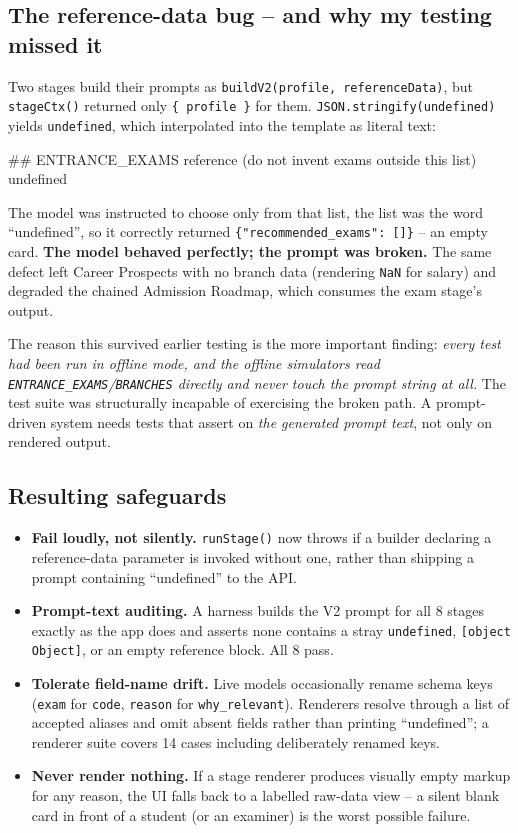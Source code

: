 \documentclass[11pt]{article}
\begin{document}
\subsection{The reference-data bug -- and why my testing missed it}
\label{sec:refdata}
Two stages build their prompts as \texttt{buildV2(profile, referenceData)}, but \texttt{stageCtx()} returned only \texttt{\{ profile \}} for them. \texttt{JSON.stringify(undefined)} yields \texttt{undefined}, which interpolated into the template as literal text:

\begin{code}
## ENTRANCE_EXAMS reference (do not invent exams outside this list)
undefined
\end{code}

The model was instructed to choose only from that list, the list was the word ``undefined'', so it correctly returned \texttt{\{"recommended\_exams": []\}} -- an empty card. \textbf{The model behaved perfectly; the prompt was broken.} The same defect left Career Prospects with no branch data (rendering \texttt{NaN} for salary) and degraded the chained Admission Roadmap, which consumes the exam stage's output.

The reason this survived earlier testing is the more important finding: \emph{every test had been run in offline mode, and the offline simulators read \texttt{ENTRANCE\_EXAMS}/\texttt{BRANCHES} directly and never touch the prompt string at all.} The test suite was structurally incapable of exercising the broken path. A prompt-driven system needs tests that assert on \emph{the generated prompt text}, not only on rendered output.

\subsection{Resulting safeguards}
\begin{itemize}
\item \textbf{Fail loudly, not silently.} \texttt{runStage()} now throws if a builder declaring a reference-data parameter is invoked without one, rather than shipping a prompt containing ``undefined'' to the API.
\item \textbf{Prompt-text auditing.} A harness builds the V2 prompt for all 8 stages exactly as the app does and asserts none contains a stray \texttt{undefined}, \texttt{[object Object]}, or an empty reference block. All 8 pass.
\item \textbf{Tolerate field-name drift.} Live models occasionally rename schema keys (\texttt{exam} for \texttt{code}, \texttt{reason} for \texttt{why\_relevant}). Renderers resolve through a list of accepted aliases and omit absent fields rather than printing ``undefined''; a renderer suite covers 14 cases including deliberately renamed keys.
\item \textbf{Never render nothing.} If a stage renderer produces visually empty markup for any reason, the UI falls back to a labelled raw-data view -- a silent blank card in front of a student (or an examiner) is the worst possible failure.
\end{itemize}
\end{document}

